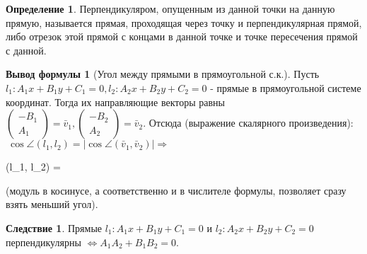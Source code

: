 \documentclass[a4paper, 12pt]{article}
\theoremstyle{definition}
\newtheorem*{definition}{Определение}
\newtheorem*{consequense}{Следствие}
\newtheorem*{formula}{Вывод формулы}
\newenvironment{boxedalign*}
  {\begin{equation*}\begin{lrbox}{\boxedalignbox}$\begin{aligned}}
  {\end{aligned}$\end{lrbox}\fbox{\usebox{\boxedalignbox}}\end{equation*}}
\begin{document}
	\begin{definition}
		Перпендикуляром, опущенным из данной точки на данную прямую, называется прямая, проходящая через точку и перпендикулярная прямой, либо отрезок этой прямой с концами в данной точке и точке пересечения прямой с данной. 
	\end{definition}
	\begin{formula}[Угол между прямыми в прямоугольной с.к.]
		Пусть $l_{1}: A_{1}x + B_{1}y + C_{1} = 0, l_{2}: A_{2}x + B_{2}y + C_{2} = 0$ - прямые в прямоугольной системе координат. Тогда их направляющие векторы равны $\begin{pmatrix} -B_{1} \\ A_{1} \end{pmatrix} = \bar{v}_{1}, \begin{pmatrix} -B_{2} \\ A_{2} \end{pmatrix} = \bar{v}_{2}$. Отсюда (выражение скалярного произведения): $\ \cos\angle(l_{1}, l_{2}) = |\cos\angle(\bar{v}_{1}, \bar{v}_{2})| \Rightarrow$ \begin{boxedalign*} \cos\angle(l_{1}, l_{2}) =  \end{boxedalign*}(модуль в косинусе, а соответственно и в числителе формулы, позволяет сразу взять меньший угол).
	\end{formula}
	\begin{consequense}
		Прямые $l_{1}: A_{1}x + B_{1}y + C_{1} = 0$ и $l_{2}: A_{2}x + B_{2}y + C_{2} = 0$ перпендикулярны $\Leftrightarrow A_{1}A_{2} + B_{1}B_{2} = 0$.
	\end{consequense}
\end{document}
